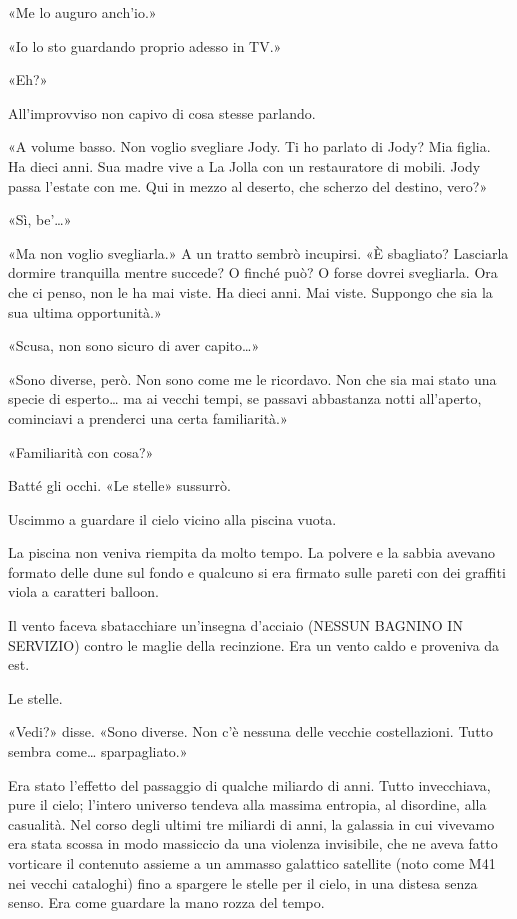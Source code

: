 «Me lo auguro anch'io.»

«Io lo sto guardando proprio adesso in TV.»

«Eh?»

All'improvviso non capivo di cosa stesse parlando.

«A volume basso. Non voglio svegliare Jody. Ti ho parlato di Jody? Mia
figlia. Ha dieci anni. Sua madre vive a La Jolla con un restauratore di
mobili. Jody passa l'estate con me. Qui in mezzo al deserto, che scherzo
del destino, vero?»

«Sì, be'\ldots»

«Ma non voglio svegliarla.» A un tratto sembrò incupirsi. «È sbagliato?
Lasciarla dormire tranquilla mentre succede? O finché può? O forse
dovrei svegliarla. Ora che ci penso, non le ha mai viste. Ha dieci anni.
Mai viste. Suppongo che sia la sua ultima opportunità.»

«Scusa, non sono sicuro di aver capito\ldots»

«Sono diverse, però. Non sono come me le ricordavo. Non che sia mai
stato una specie di esperto\ldots{} ma ai vecchi tempi, se passavi
abbastanza notti all'aperto, cominciavi a prenderci una certa
familiarità.»

«Familiarità con cosa?»

Batté gli occhi. «Le stelle» sussurrò.

\separatorefiori

Uscimmo a guardare il cielo vicino alla piscina vuota.

La piscina non veniva riempita da molto tempo. La polvere e la sabbia
avevano formato delle dune sul fondo e qualcuno si era firmato sulle
pareti con dei graffiti viola a caratteri balloon.

Il vento faceva sbatacchiare un'insegna d'acciaio ({NESSUN BAGNINO IN
	SERVIZIO}) contro le maglie della recinzione. Era un vento caldo e
proveniva da est.

Le stelle.

«Vedi?» disse. «Sono diverse. Non c'è nessuna delle vecchie
costellazioni. Tutto sembra come\ldots{} sparpagliato.»

Era stato l'effetto del passaggio di qualche miliardo di anni. Tutto
invecchiava, pure il cielo; l'intero universo tendeva alla massima
entropia, al disordine, alla casualità. Nel corso degli ultimi tre
miliardi di anni, la galassia in cui vivevamo era stata scossa in modo
massiccio da una violenza invisibile, che ne aveva fatto vorticare il
contenuto assieme a un ammasso galattico satellite (noto come M41 nei
vecchi cataloghi) fino a spargere le stelle per il cielo, in una distesa
senza senso. Era come guardare la mano rozza del tempo.


